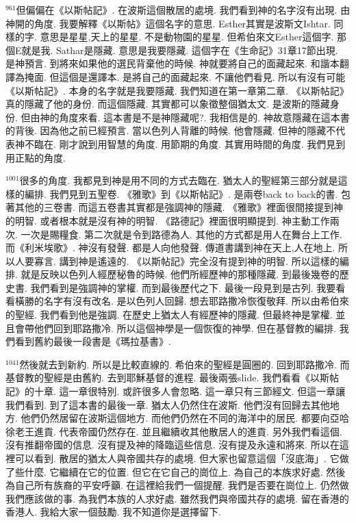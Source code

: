 \documentclass{book}
\begin{document}
$^{961}$但偏偏在《以斯帖記》.
在波斯這個散居的處境.
我們看到神的名字沒有出現.
由神開的角度.
我要解釋《以斯帖》這個名字的意思.
Esther其實是波斯文Ishtar.
同樣的字.
意思是星星,天上的星星.
不是動物園的星星.
但希伯來文Esther這個字.
那個E就是我.
Sathar是隱藏.
意思是我要隱藏.
這個字在《生命記》31章17節出現.
是神預言.
到將來如果他的選民背棄他的時候.
神就要將自己的面藏起來.
和諧本翻譯為掩面.
但這個是還譯本.
是將自己的面藏起來.
不讓他們看見.
所以有沒有可能《以斯帖記》.
本身的名字就是我要隱藏.
我們知道在第一章第二章.
《以斯帖記》真的隱藏了他的身份.
而這個隱藏.
其實都可以象徵整個猶太文.
是波斯的隱藏身份.
但由神的角度來看.
這本書是不是神隱藏呢?.
我相信是的.
神故意隱藏在這本書的背後.
因為他之前已經預言.
當以色列人背離的時候.
他會隱藏.
但神的隱藏不代表神不臨在.
剛才說到用智慧的角度.
用節期的角度.
其實用時間的角度.
我們見到用正點的角度.

$^{1001}$很多的角度.
我都見到神是用不同的方式去臨在.
猶太人的聖經第三部分就是這樣的編排.
我們見到五聖卷.
《雅歌》到《以斯帖記》.
是兩卷back to back的書.
包著其他的三卷書.
而這五卷書其實都是強調神的隱藏.
《雅歌》裡面很間接提到神的明智.
或者根本就是沒有神的明智.
《路德記》裡面很明顯提到.
神主動工作兩次.
一次是賜糧食.
第二次就是令到路德為人.
其他的方式都是用人在舞台上工作.
而《利米埃歌》.
神沒有發聲.
都是人向他發聲.
傳道書講到神在天上,人在地上.
所以人要寡言.
講到神是遙遠的.
《以斯帖記》完全沒有提到神的明智.
所以這樣的編排.
就是反映以色列人經歷秘魯的時候.
他們所經歷神的那種隱藏.
到最後幾卷的歷史書.
我們看到是強調神的掌權.
而到最後歷代之下.
最後一段見到是古列.
我要看看橫勝的名字有沒有改名.
是以色列人回歸.
想去耶路撒冷恢復敬拜.
所以由希伯來的聖經.
我們看到他是強調.
在歷史上猶太人有經歷神的隱藏.
但最終神是掌權.
並且會帶他們回到耶路撒冷.
所以這個神學是一個恢復的神學.
但在基督教的編排.
我們看到舊約最後一段書是《瑪拉基書》.

$^{1041}$然後就去到新約.
所以是比較直線的.
希伯來的聖經是圓圈的.
回到耶路撒冷.
而基督教的聖經是由舊約.
去到耶穌基督的進程.
最後兩張slide.
我們看看《以斯帖記》的十章.
這一章很特別.
或許很多人會忽略.
這一章只有三節經文.
但這一章讓我們看到.
到了這本書的最後一章.
猶太人仍然住在波斯.
他們沒有回歸去其他地方.
他們仍然居留在波斯這個地方.
而他們仍然在不同的海洋中的居民.
都要向亞哈徐老王進貢.
代表帝國仍然存在.
並且繼續收其他散居人的進貢.
另外我們看這個.
沒有推翻帝國的信息.
沒有提及神的降臨這些信息.
沒有提及永遠和將來.
所以在這裡可以看到.
散居的猶太人與帝國共存的處境.
但大家也留意這個「沒底海」.
它做了些什麼.
它繼續在它的位置.
但它在它自己的崗位上.
為自己的本族求好處.
然後為自己所有族裔的平安呼籲.
在這裡給我們一個提醒.
我們是否要在崗位上.
仍然做我們應該做的事.
為我們本族的人求好處.
雖然我們與帝國共存的處境.
留在香港的香港人.
我給大家一個鼓勵.
我不知道你是選擇留下.
\end{document}
